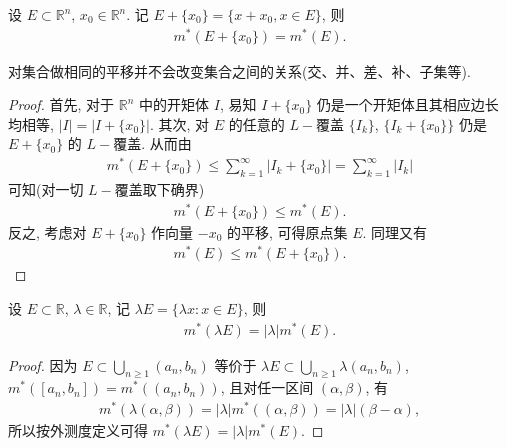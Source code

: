 \documentclass[../../main.tex]{subfiles}
\begin{document}
\begin{theorem}[外测度的平移不变性]\label{theorem:外测度的平移不变性}
设 \(E \subset \mathbb{R}^n\), \(x_0 \in \mathbb{R}^n\). 记 \(E + \{x_0\} = \{x + x_0, x \in E\}\), 则
\begin{align}
m^*(E + \{x_0\}) = m^*(E). \label{eq:2.1}
\end{align}
\end{theorem}
\begin{remark}
对集合做相同的平移并不会改变集合之间的关系(交、并、差、补、子集等).
\end{remark}
\begin{proof}
首先, 对于 \(\mathbb{R}^n\) 中的开矩体 \(I\), 易知 \(I + \{x_0\}\) 仍是一个开矩体且其相应边长均相等, \(|I| = |I + \{x_0\}|\). 其次, 对 \(E\) 的任意的 \(L -\)覆盖 \(\{I_k\}\), \(\{I_k + \{x_0\}\}\) 仍是 \(E + \{x_0\}\) 的 \(L -\)覆盖. 从而由
\begin{align*}
m^*(E + \{x_0\}) \leqslant  \sum_{k = 1}^{\infty} |I_k + \{x_0\}| = \sum_{k = 1}^{\infty} |I_k|
\end{align*}
可知(对一切 \(L -\)覆盖取下确界)
\begin{align*}
m^*(E + \{x_0\}) \leqslant  m^*(E).
\end{align*}
反之, 考虑对 \(E + \{x_0\}\) 作向量 \(-x_0\) 的平移, 可得原点集 \(E\). 同理又有
\begin{align*}
m^*(E) \leqslant  m^*(E + \{x_0\}).
\end{align*} 

\end{proof}

\begin{theorem}[外测度的数乘]\label{theorem:外测度的数乘}
设 \(E \subset \mathbb{R}\), \(\lambda \in \mathbb{R}\), 记 \(\lambda E = \{ \lambda x : x \in E\}\), 则
\begin{align*}
m^*(\lambda E) = |\lambda| m^*(E).
\end{align*}
\end{theorem}
\begin{proof}
因为 \(E \subset \bigcup_{n \geqslant  1} (a_n, b_n)\) 等价于 \(\lambda E \subset \bigcup_{n \geqslant  1} \lambda (a_n, b_n)\), \(m^*([a_n, b_n]) = m^*((a_n, b_n))\), 且对任一区间 \((\alpha, \beta)\), 有
\begin{align*}
m^*(\lambda (\alpha, \beta)) = |\lambda| m^*((\alpha, \beta)) = |\lambda| (\beta - \alpha),
\end{align*}
所以按外测度定义可得 \(m^*(\lambda E) = |\lambda| m^*(E)\). 

\end{proof}
\end{document}
